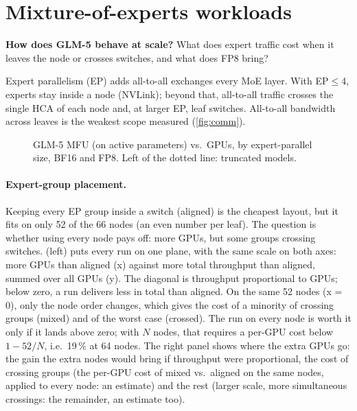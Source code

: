 \section{Mixture-of-experts workloads}
\label{sec:moe}

\begin{question}
  \textbf{How does GLM-5 behave at scale?} What does expert traffic cost when it leaves the node or crosses
  switches, and what does FP8 bring?
\end{question}

Expert parallelism (EP) adds all-to-all exchanges every MoE layer. With EP$\le$4, experts stay inside a
node (NVLink); beyond that, all-to-all traffic crosses the single HCA of each node and, at larger EP, leaf
switches. All-to-all bandwidth across leaves is the weakest scope measured (\cref{fig:comm}).

\begin{figure}[h]
  \centering{}
  \caption{GLM-5 MFU (on active parameters) vs.\ GPUs, by expert-parallel size, BF16 and
    FP8. Left of the dotted line: truncated models.}
  \label{fig:moe}
\end{figure}

\paragraph{Expert-group placement.} Keeping every EP group inside a switch (aligned) is the cheapest layout,
but it fits on only 52 of the 66 nodes (an even number per leaf). The question is whether using every node
pays off: more GPUs, but some groups crossing switches.  (left) puts every run
on one plane, with the same scale on both axes: more GPUs than aligned (x) against more total throughput
than aligned, summed over all GPUs (y). The diagonal is throughput proportional to GPUs; below zero, a run
delivers less in total than aligned. On the same 52 nodes (x = 0), only the node order changes, which gives
the cost of a minority of crossing groups (mixed) and of the worst case (crossed). The run on every node is
worth it only if it lands above zero; with $N$ nodes, that requires a per-GPU cost below $1 - 52/N$,
i.e.\ 19\,\% at 64 nodes. The right panel shows where the extra GPUs go: the gain the extra nodes would
bring if throughput were proportional, the cost of crossing groups (the per-GPU cost of mixed vs.\ aligned
on the same nodes, applied to every node: an estimate) and the rest (larger scale, more simultaneous
crossings: the remainder, an estimate too).


